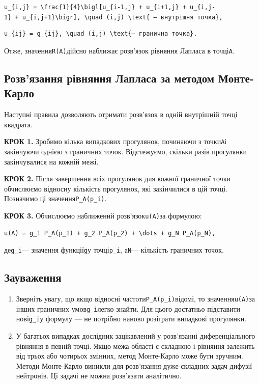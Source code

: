 \documentclass[
  ukrainian,
]{article}
\begin{document}
\texttt{u\_\{i,j\}\ =\ \textbackslash{}frac\{1\}\{4\}\textbackslash{}bigl{[}u\_\{i-1,j\}\ +\ u\_\{i+1,j\}\ +\ u\_\{i,j-1\}\ +\ u\_\{i,j+1\}\textbackslash{}bigr{]},\ \textbackslash{}quad\ (i,j)\ \textbackslash{}text\{\ —\ внутрішня\ точка\},}

\begin{verbatim}
u_{ij} = g_{ij}, \quad (i,j) \text{— гранична точка}.
\end{verbatim}

Отже, значення\texttt{R(A)}дійсно наближає розв'язок рівняння Лапласа в
точці\texttt{A}.

\subsection{Розв'язання рівняння Лапласа за методом
Монте-Карло}\label{ux440ux43eux437ux432ux44fux437ux430ux43dux43dux44f-ux440ux456ux432ux43dux44fux43dux43dux44f-ux43bux430ux43fux43bux430ux441ux430-ux437ux430-ux43cux435ux442ux43eux434ux43eux43c-ux43cux43eux43dux442ux435-ux43aux430ux440ux43bux43e}

Наступні правила дозволяють отримати розв'язок в одній внутрішній точці
квадрата.

\textbf{КРОК 1.} Зробимо кілька випадкових прогулянок, починаючи з
точки\texttt{A}і закінчуючи однією з граничних точок. Відстежуємо,
скільки разів прогулянки закінчувалися на кожній межі.

\textbf{КРОК 2.} Після завершення всіх прогулянок для кожної граничної
точки обчислюємо відносну кількість прогулянок, які закінчилися в цій
точці. Позначимо ці значення\texttt{P\_A(p\_i)}.

\textbf{КРОК 3.} Обчислюємо наближений розв'язок\texttt{u(A)}за
формулою:

\begin{verbatim}
u(A) = g_1 P_A(p_1) + g_2 P_A(p_2) + \dots + g_N P_A(p_N),
\end{verbatim}

де\texttt{g\_i}--- значення функції\texttt{g}у точці\texttt{p\_i},
а\texttt{N}--- кількість граничних точок.

\subsection{Зауваження}\label{ux437ux430ux443ux432ux430ux436ux435ux43dux43dux44f-10}

\begin{enumerate}
\def\labelenumi{\arabic{enumi}.}
\item
  Зверніть увагу, що якщо відносні частоти\texttt{P\_A(p\_i)}відомі, то
  значення\texttt{u(A)}за інших граничних умов\texttt{g\_i}легко знайти.
  Для цього достатньо підставити нові\texttt{g\_i}у формулу --- не
  потрібно наново розіграти випадкові прогулянки.
\item
  У багатьох випадках дослідник зацікавлений у розв'язанні
  диференціального рівняння в певній точці. Якщо межа області є складною
  і рівняння залежить від трьох або чотирьох змінних, метод Монте-Карло
  може бути зручним. Методи Монте-Карло виникли для розв'язання дуже
  складних задач дифузії нейтронів. Ці задачі не можна розв'язати
  аналітично.
\end{enumerate}
\end{document}
